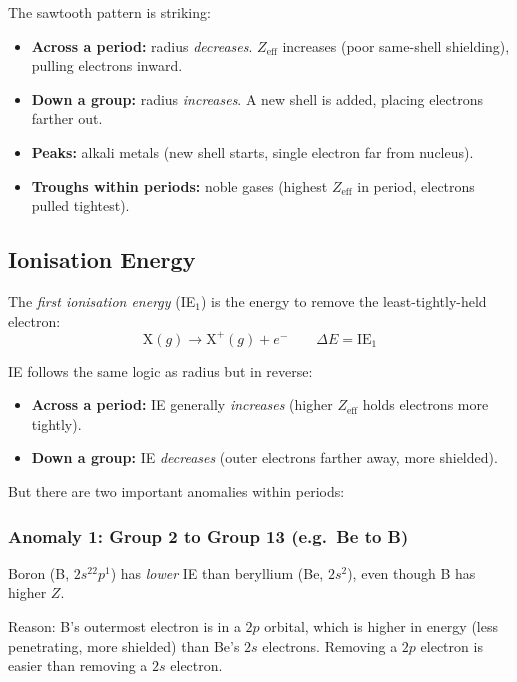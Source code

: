 \documentclass[12pt, a4paper]{book}
\newcommand{\newterm}[1]{\textit{\textcolor{DiscoveryColor}{#1}}}
\begin{document}
\vspace{0.4em}

The sawtooth pattern is striking:
\begin{itemize}[nosep, leftmargin=2em]
  \item \textbf{Across a period:} radius \emph{decreases}.
        $Z_\text{eff}$ increases (poor same-shell shielding),
        pulling electrons inward.
  \item \textbf{Down a group:} radius \emph{increases}.
        A new shell is added, placing electrons farther out.
  \item \textbf{Peaks:} alkali metals (new shell starts,
        single electron far from nucleus).
  \item \textbf{Troughs within periods:} noble gases
        (highest $Z_\text{eff}$ in period, electrons
        pulled tightest).
\end{itemize}

\subsection{Ionisation Energy}

The \newterm{first ionisation energy} (IE$_1$) is the
energy to remove the least-tightly-held electron:
\[
  \text{X}(g) \to \text{X}^+(g) + e^- \qquad \Delta E = \text{IE}_1
\]

IE follows the same logic as radius but in reverse:
\begin{itemize}[nosep, leftmargin=2em]
  \item \textbf{Across a period:} IE generally \emph{increases}
        (higher $Z_\text{eff}$ holds electrons more tightly).
  \item \textbf{Down a group:} IE \emph{decreases}
        (outer electrons farther away, more shielded).
\end{itemize}

But there are two important anomalies within periods:

\subsubsection{Anomaly 1: Group 2 to Group 13 (e.g.\ Be to B)}

Boron (B, $2s^22p^1$) has \emph{lower} IE than
beryllium (Be, $2s^2$), even though B has higher $Z$.

Reason: B's outermost electron is in a $2p$ orbital,
which is higher in energy (less penetrating, more shielded)
than Be's $2s$ electrons.
Removing a $2p$ electron is easier than removing a $2s$ electron.
\end{document}
